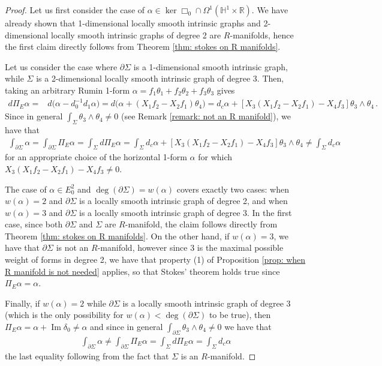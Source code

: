 \documentclass[dvipsnames]{amsart}
\theoremstyle{definition}
\theoremstyle{definition}
\numberwithin{equation}{section}
\newcommand{\R}{\mathbb{R}}
\renewcommand{\H}{\mathbb{H}}
\begin{document}
\begin{proof}
    Let us first consider the case of $\alpha\in\ker\Box_0\cap\Omega^1(\H^1\times\R)$. We have already shown that 1-dimensional locally smooth intrinsic graphs and 2-dimensional locally smooth intrinsic graphs of degree 2 are $R$-manifolds, hence the first claim directly follows from Theorem \ref{thm: stokes on R manifolds}.

    Let us consider the case where $\partial\Sigma$ is a 1-dimensional smooth intrinsic graph, while $\Sigma$ is a 2-dimensional locally smooth intrinsic graph of degree 3. Then, taking an arbitrary Rumin 1-form $\alpha=f_1\theta_1+f_2\theta_2+f_3\theta_3$ gives
    \begin{align*}
        d\Pi_E\alpha=&d\big(\alpha-d_0^{-1}d_1\alpha\big)=d\big(\alpha+(X_1f_2-X_2f_1)\theta_4\big)=d_c\alpha+[X_3(X_1f_2-X_2f_1)-X_4f_3]\theta_3\wedge\theta_4\,.
    \end{align*}
    Since in general $\int_\Sigma\theta_3\wedge\theta_4\neq 0$ (see Remark \ref{remark: not an R manifold}), we have that
    \begin{align*}
        \int_{\partial\Sigma}\alpha=\int_{\partial\Sigma}\Pi_E\alpha=\int_\Sigma d\Pi_E\alpha=\int_{\Sigma}d_c\alpha+[X_3(X_1f_2-X_2f_1)-X_4f_3]\theta_3\wedge\theta_4\neq\int_\Sigma d_c\alpha
    \end{align*}
    for an appropriate choice of the horizontal 1-form $\alpha$ for which $X_3(X_1f_2-X_2f_1)-X_4f_3\neq 0$.

    The case of $\alpha\in E_0^2$ and $\operatorname{deg}(\partial\Sigma)=w(\alpha)$ covers exactly two cases: when $w(\alpha)=2$ and $\partial\Sigma$ is a locally smooth intrinsic graph of degree 2, and when $w(\alpha)=3$ and $\partial\Sigma$ is a locally smooth intrinsic graph of degree 3. In the first case, since both $\partial\Sigma$ and $\Sigma$ are $R$-manifold, the claim follows directly from Theorem \ref{thm: stokes on R manifolds}. On the other hand, if $w(\alpha)=3$, we have that $\partial\Sigma$ is not an $R$-manifold, however since $3$ is the maximal possible weight of forms in degree 2, we have that property (1) of Proposition \ref{prop: when R manifold is not needed} applies, so that Stokes' theorem holds true since $\Pi_E\alpha=\alpha$.

    Finally, if $w(\alpha)=2$ while $\partial\Sigma$ is a locally smooth intrinsic graph of degree 3 (which is the only possibility for $w(\alpha)<\operatorname{deg}(\partial\Sigma)$ to be true), then $\Pi_E\alpha=\alpha+\operatorname{Im}\delta_0\neq \alpha$ and since in general $\int_{\partial\Sigma}\theta_3\wedge\theta_4\neq 0$ we have that
    \begin{align*}
        \int_{\partial\Sigma}\alpha\neq\int_{\partial\Sigma}\Pi_E\alpha=\int_\Sigma d\Pi_E\alpha=\int_\Sigma d_c\alpha
    \end{align*}
    the last equality following from the fact that $\Sigma$ is an $R$-manifold.
\end{proof}
\end{document}
